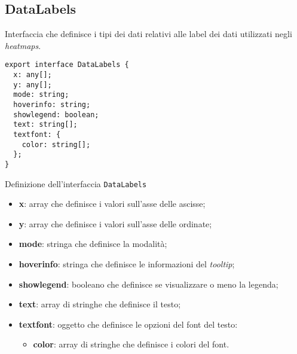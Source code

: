 \subsection{DataLabels}
Interfaccia che definisce i tipi dei dati relativi alle label dei dati utilizzati negli \textit{heatmaps}.

\begin{verbatim}
export interface DataLabels {
  x: any[];
  y: any[];
  mode: string;
  hoverinfo: string;
  showlegend: boolean;
  text: string[];
  textfont: {
    color: string[];
  };
}
\end{verbatim}
\begin{listing}[H]
      \caption{Definizione dell'interfaccia \texttt{DataLabels}}
      \label{listing:dataLabels}
\end{listing}
\begin{itemize}
      \item \textbf{x}: array che definisce i valori sull'asse delle ascisse;
      \item \textbf{y}: array che definisce i valori sull'asse delle ordinate;
      \item \textbf{mode}: stringa che definisce la modalità;
      \item \textbf{hoverinfo}: stringa che definisce le informazioni del \textit{tooltip};
      \item \textbf{showlegend}: booleano che definisce se visualizzare o meno la legenda;
      \item \textbf{text}: array di stringhe che definisce il testo;
      \item \textbf{textfont}: oggetto che definisce le opzioni del font del testo:
            \begin{itemize}
                  \item \textbf{color}: array di stringhe che definisce i colori del font.
            \end{itemize}
\end{itemize}

